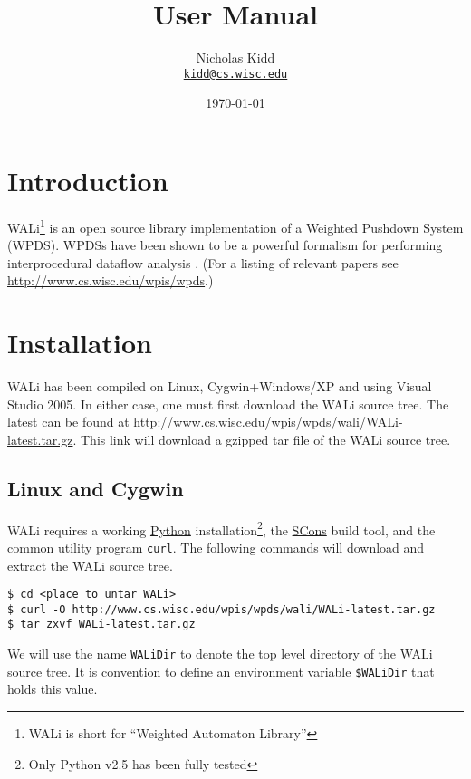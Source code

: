 \documentclass[english,a4paper,11pt]{article}
\title{\WALi User Manual}
\date{\today}
\author{ Nicholas Kidd \\ { \href{mailto:kidd@cs.wisc.edu}{\nolinkurl{kidd@cs.wisc.edu}}} }
\theoremstyle{definition}
\def\WALi{\textsf{WALi}\xspace}
\begin{document}
\maketitle

\section{Introduction}
\label{Se:Introduction}
\WALi\footnote{\WALi is short for ``Weighted Automaton Library''} is an open
source library implementation of a Weighted Pushdown System (WPDS). WPDSs have
been shown to be a powerful formalism for performing interprocedural dataflow
analysis \citep{SAS:RSJ:2003,SCP:RSJM:2005,FSTTCS:RLK:2007}. (For a listing of
relevant papers see \url{http://www.cs.wisc.edu/wpis/wpds}.)

\section{Installation}
\label{Se:Installation}
\WALi has been compiled on Linux, Cygwin+Windows/XP and using
Visual Studio 2005. In either case, one must first download the \WALi source
tree. The latest can be found at
\url{http://www.cs.wisc.edu/wpis/wpds/wali/WALi-latest.tar.gz}.
This link will download a gzipped tar file of the \WALi source tree.

\subsection{Linux and Cygwin}
\label{Se:Linux}
\WALi requires a working \href{http://www.python.org}{Python}
installation\footnote{Only Python v2.5 has been fully tested},
the \href{http://www.scons.org}{SCons} build tool, and the common utility
program \verb!curl!. The following commands will download and extract the \WALi
source tree.

\vspace{1em}
\noindent
\begin{cmdbox}
\begin{verbatim}
$ cd <place to untar WALi>
$ curl -O http://www.cs.wisc.edu/wpis/wpds/wali/WALi-latest.tar.gz 
$ tar zxvf WALi-latest.tar.gz
\end{verbatim}
\end{cmdbox}
\vspace{1em}

\noindent  We will use the name \verb!WALiDir! to denote the top level directory of the
\WALi source tree. It is convention to define an environment variable
\verb!$WALiDir! that holds this value.
\end{document}

